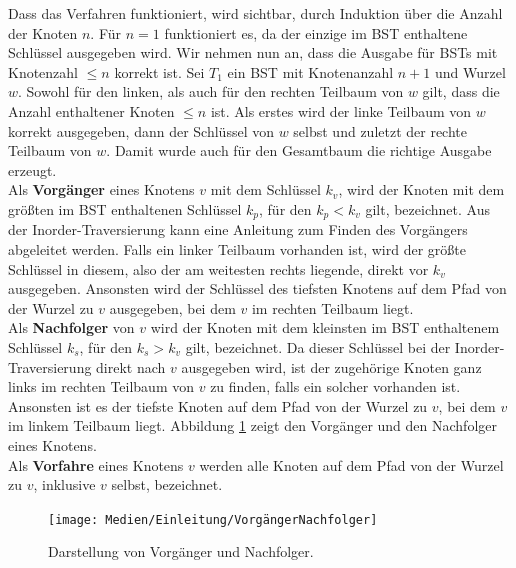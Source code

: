 \documentclass[a4paper,12pt]{article}
\begin{document}
\noindent Dass das Verfahren funktioniert, wird sichtbar, durch Induktion über die Anzahl der Knoten $n$.
Für $n = 1$ funktioniert es, da der einzige im BST enthaltene Schlüssel ausgegeben wird. Wir nehmen nun an, dass die Ausgabe für BSTs mit Knotenzahl $\leq n$ korrekt ist. Sei $T_1$ ein BST mit Knotenanzahl $n + 1$ und Wurzel $w$. Sowohl für den linken, als auch für den rechten Teilbaum von $w$ gilt, dass die Anzahl enthaltener Knoten $\leq n$ ist. Als erstes wird der linke Teilbaum von $w$ korrekt ausgegeben, dann der Schlüssel von $w$ selbst und zuletzt der rechte Teilbaum von $w$. Damit wurde auch für den Gesamtbaum die richtige
Ausgabe erzeugt. \\
Als \textbf{Vorgänger} eines Knotens $v$ mit dem Schlüssel $k_v$, wird der Knoten mit dem größten im BST enthaltenen Schlüssel $k_p$, für den $k_p < k_v$ gilt, bezeichnet. Aus der Inorder-Traversierung kann eine Anleitung zum Finden des Vorgängers abgeleitet werden. Falls ein linker Teilbaum vorhanden ist, wird der größte Schlüssel in diesem, also der am weitesten rechts liegende, direkt vor $k_v$ ausgegeben. Ansonsten wird der Schlüssel des tiefsten Knotens auf dem Pfad von der Wurzel zu $v$ ausgegeben, bei dem $v$ im rechten Teilbaum liegt. \\
Als \textbf{Nachfolger} von $v$ wird der Knoten mit dem kleinsten im BST enthaltenem Schlüssel $k_s$, für den $k_s > k_v$ gilt, bezeichnet. Da dieser Schlüssel bei der Inorder-Traversierung direkt nach $v$ ausgegeben wird, ist der zugehörige Knoten ganz links im rechten Teilbaum von $v$ zu finden, falls ein solcher vorhanden ist. Ansonsten ist es der tiefste Knoten auf dem Pfad von der Wurzel zu $v$, bei dem $v$ im linkem Teilbaum liegt. Abbildung \ref{fig:VorgängerNachfolger} zeigt den Vorgänger und den Nachfolger eines Knotens.\\
 Als \textbf{Vorfahre} eines Knotens $v$ werden alle Knoten auf dem Pfad von der Wurzel zu $v$, inklusive $v$ selbst, bezeichnet. 

\begin{figure}[H]
	\centering
	\texttt{[image: Medien/Einleitung/VorgängerNachfolger]}
	\caption{Darstellung von Vorgänger und Nachfolger. }
	\label{fig:VorgängerNachfolger}
\end{figure}
\end{document}
